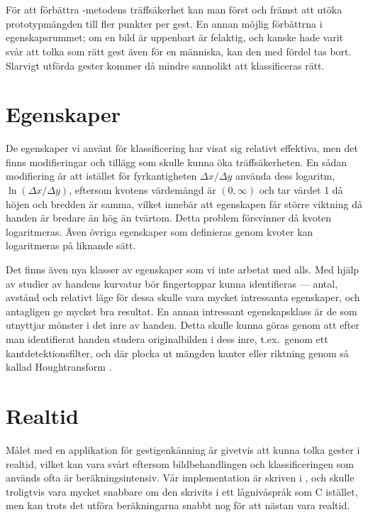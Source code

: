 \documentclass[../rapport_MVEX01-11-05]{subfiles}
\begin{document}
\section{\knn}
För att förbättra \knn-metodens träffsäkerhet kan man först och
främst att utöka prototypmängden till fler punkter per gest. En annan möjlig
förbättrna i egenskapsrummet; om en bild är uppenbart är felaktig, och
kanske hade varit
svår att tolka som rätt gest även för en människa,
kan den med fördel tas bort.
Slarvigt utförda gester kommer då mindre sannolikt att
klassificeras rätt.

\section{Egenskaper}
De egenskaper vi använt för klassificering har visat sig relativt
effektiva, men det finns modifieringar och tillägg som skulle kunna
öka träffsäkerheten.
En sådan modifiering är att istället för fyrkantigheten $\Delta
x/\Delta y$ använda dess logaritm, $\ln(\Delta x/\Delta
y)$, eftersom kvotens värdemängd är $(0,\infty)$ och tar värdet 1 då
höjen och bredden är samma, vilket innebär att egenskapen får större
viktning då handen är bredare än hög än tvärtom. Detta problem
försvinner då kvoten logaritmeras. Även övriga egenskaper som
definieras genom kvoter kan logaritmeras på liknande sätt.

Det finns även nya klasser av egenskaper som vi inte arbetat med
alls. Med hjälp av studier av handens kurvatur bör fingertoppar kunna
identifieras --- antal, avstånd och relativt läge för dessa skulle vara
mycket intressanta egenskaper, och antagligen ge mycket bra resultat.
En annan intressant egenskapsklass är de som utnyttjar mönster i det
inre av handen. Detta skulle kunna göras
genom att efter man identifierat handen studera originalbilden i dess
inre, t.ex.~genom ett kantdetektionsfilter, och där plocka ut mängden
kanter eller riktning genom så kallad Houghtransform \cite[s.~23]{Rudemo09}.

\section{Realtid}
Målet med en applikation för gestigenkänning är givetvis att kunna tolka
gester i realtid, vilket kan vara svårt eftersom bildbehandlingen och
klassificeringen som används ofta är beräkningsintensiv. Vår implementation
är skriven i \MATLAB, och skulle troligtvis vara mycket snabbare om den
skrivits i ett lågnivåspråk som C istället, men kan trots det utföra
beräkningarna snabbt nog för att nästan vara realtid.
\end{document}
